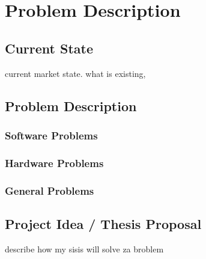 \chapter{Problem Description}
\beginchapter

\section{Current State}
current market state. what is existing,

\section{Problem Description}
\subsection{Software Problems}
\subsection{Hardware Problems}
\subsection{General Problems}

\section{Project Idea / Thesis Proposal}
describe how my sisis will solve za broblem